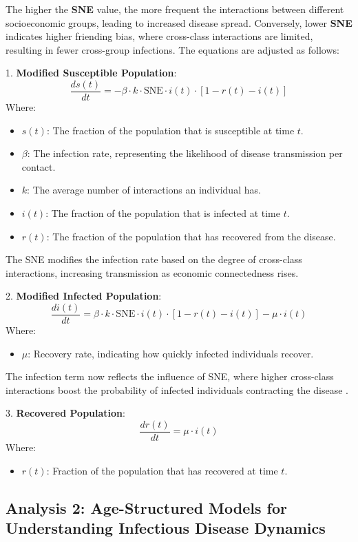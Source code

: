 \documentclass[9 pt]{article} %
\begin{document}
The higher the \textbf{SNE} value, the more frequent the interactions between different socioeconomic groups, leading to increased disease spread. Conversely, lower \textbf{SNE} indicates higher friending bias, where cross-class interactions are limited, resulting in fewer cross-group infections. The equations are adjusted as follows:

1. \textbf{Modified Susceptible Population}:
   \[
   \frac{ds(t)}{dt} = -\beta \cdot k \cdot \text{SNE} \cdot i(t) \cdot [1 - r(t) - i(t)]
   \]
   Where:
    \begin{itemize}
        \item \(s(t)\): The fraction of the population that is susceptible at time \(t\).
        \item \(\beta\): The infection rate, representing the likelihood of disease transmission per contact. 
        \item \(k\): The average number of interactions an individual has.
        \item \(i(t)\): The fraction of the population that is infected at time \(t\).
        \item \(r(t)\): The fraction of the population that has recovered from the disease.
    \end{itemize}
   The SNE modifies the infection rate based on the degree of cross-class interactions, increasing transmission as economic connectedness rises.

2. \textbf{Modified Infected Population}:
   \[
   \frac{di(t)}{dt} = \beta \cdot k \cdot \text{SNE} \cdot i(t) \cdot [1 - r(t) - i(t)] - \mu \cdot i(t)
   \]
   Where:
   \begin{itemize}
       \item \(\mu\): Recovery rate, indicating how quickly infected individuals recover.
   \end{itemize}
   The infection term now reflects the influence of SNE, where higher cross-class interactions boost the probability of infected individuals contracting the disease \cite{nunner2021model}.

3. \textbf{Recovered Population}:
   \[
   \frac{dr(t)}{dt} = \mu \cdot i(t)
   \]
   Where:
   \begin{itemize}
       \item \(r(t)\): Fraction of the population that has recovered at time \(t\).
   \end{itemize}

\subsection{Analysis 2: Age-Structured Models for Understanding Infectious Disease Dynamics}
\end{document}

